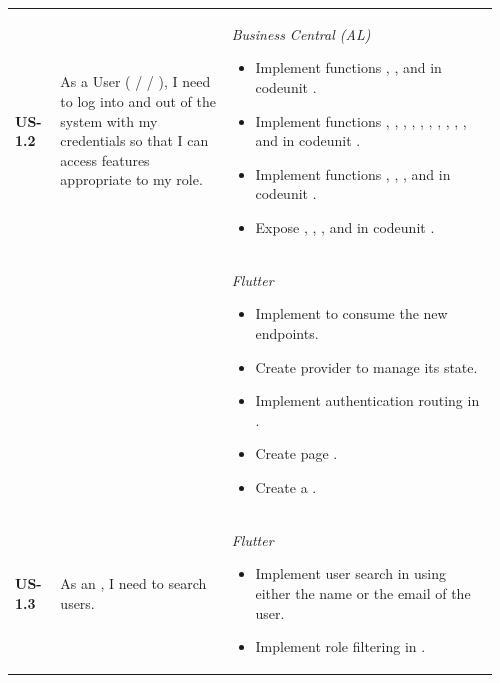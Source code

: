 \begin{longtable}{@{} P{0.09\linewidth} P{0.34\linewidth} P{0.53\linewidth} @{}}
	\midrule
	\textbf{US-1.2}
	& As a User ( /  / ),
	I need to log into and out of the system with my credentials so that I can access
	features appropriate to my role.
	& \noindent\textit{Business Central (AL)}
	\begin{itemize}[nosep, leftmargin=*]
		\item Implement functions , , and  in codeunit .
		\item Implement functions , , , , , , , , , , and  in codeunit .
		\item Implement functions , , , and  in codeunit .
		\item Expose , , , and  in codeunit .
	\end{itemize}
\\ & &
	\noindent\textit{Flutter}
	\begin{itemize}[nosep, leftmargin=*]
		\item Implement  to consume the new endpoints.
		\item Create provider  to manage its state.
		\item Implement authentication routing in .
		\item Create page .
		\item Create a .
	\end{itemize}\\
	\midrule
	\textbf{US-1.3}
	& As an , I need to search users.
	& \noindent\textit{Flutter}
	\begin{itemize}[nosep, leftmargin=*]
		\item Implement user search in  using either the name or the email of the user.
		\item Implement role filtering in .
		

\end{itemize}
\end{longtable}
